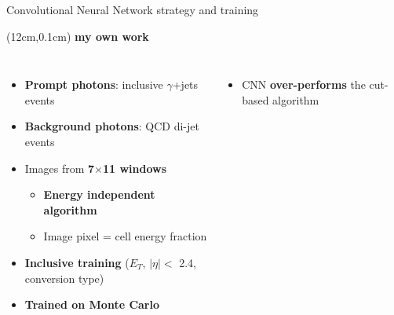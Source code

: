 \begin{frame}{Convolutional Neural Network strategy and training}
\begin{textblock*}{5cm}(12cm,0.1cm) %
   \textcolor{HHred}{\Large\textbf{my own work}}
\end{textblock*}
\begin{columns}
\begin{itemize}
    \item \textcolor{HHred}{\textbf{Prompt photons}}: inclusive $\gamma$+jets events
    \item \textcolor{HHblue}{\textbf{Background photons}}: QCD di-jet events 
    \pause
    \item Images from \textbf{7$\times$11 windows} 
    \begin{itemize}
        \item \textbf{Energy independent algorithm}
        \item Image pixel = cell energy fraction
    \end{itemize}
    \pause
    \item \textbf{Inclusive training} ($E_T$, $|\eta| < $ 2.4, conversion type)
    \item \textbf{Trained on Monte Carlo}
    \end{itemize}
    \pause
    \begin{itemize}
        \item CNN \textcolor{HHred}{\textbf{over-performs}} the cut-based algorithm
    \end{itemize}
    
    


\end{columns}
\end{frame}
